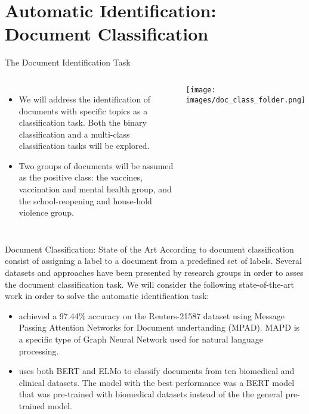 \documentclass[aspectratio=169]{beamer}
\begin{document}



\section{Automatic Identification: Document Classification}
\begin{frame}{The Document Identification Task}
    \begin{columns}
        \begin{itemize}
            \item We will address the identification of documents with specific topics as a classification task. Both the binary classification and a multi-class classification tasks will be explored.
            \item Two groups of documents will be assumed as the positive class: the vaccines, vaccination and mental health group, and the school-reopening and house-hold violence group.
        \end{itemize}
        
        \texttt{[image: images/doc\_class\_folder.png]}
    \end{columns}
\end{frame}

\begin{frame}{Document Classification: State of the Art}
    According to \cite{DC_SPRINGER} document classification consist of assigning a label to a document from a predefined set of labels. Several datasets and approaches have been presented by research groups in order to asses the document classification task. We will consider the following state-of-the-art work in order to solve the automatic identification task:
    \begin{itemize}
        \item \cite{DC_REUTERS} achieved a 97.44\% accuracy on the Reuters-21587 dataset using Message Passing Attention Networks for Document undertanding (MPAD). MAPD is a specific type of Graph Neural Network used for natural language processing.
        \item \cite{DC_BERT_ELMO} uses both BERT and ELMo to classify documents from ten biomedical and clinical datasets. The model with the best performance was a BERT model that was pre-trained with biomedical datasets instead of the the general pre-trained model.
    \end{itemize}
\end{frame}
\end{document}
